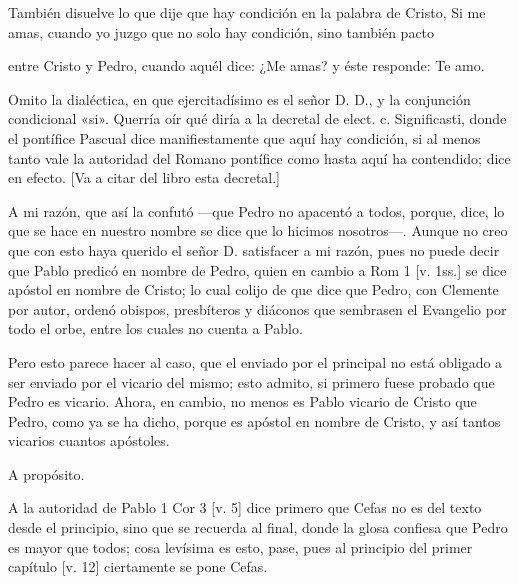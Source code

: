 También disuelve lo que dije que hay condición en la palabra de Cristo, Si me amas, cuando yo juzgo que no solo hay condición, sino también pacto

entre Cristo y Pedro, cuando aquél dice: ¿Me amas? y éste responde: Te amo.

Omito la dialéctica, en que ejercitadísimo es el señor D. D., y la conjunción condicional «si». Querría oír qué diría a la decretal de elect. c. Significasti, donde el pontífice Pascual dice manifiestamente que aquí hay condición, si al menos tanto vale la autoridad del Romano pontífice como hasta aquí ha contendido; dice en efecto. [Va a citar del libro esta decretal.]

A mi razón, que así la confutó —que Pedro no apacentó a todos, porque, dice, lo que se hace en nuestro nombre se dice que lo hicimos nosotros—. Aunque no creo que con esto haya querido el señor D. satisfacer a mi razón, pues no puede decir que Pablo predicó en nombre de Pedro, quien en cambio a Rom 1 [v. 1ss.] se dice apóstol en nombre de Cristo; lo cual colijo de que dice que Pedro, con Clemente por autor, ordenó obispos, presbíteros y diáconos que sembrasen el Evangelio por todo el orbe, entre los cuales no cuenta a Pablo.

Pero esto parece hacer al caso, que el enviado por el principal no está obligado a ser enviado por el vicario del mismo; esto admito, si primero fuese probado que Pedro es vicario. Ahora, en cambio, no menos es Pablo vicario de Cristo que Pedro, como ya se ha dicho, porque es apóstol en nombre de Cristo, y así tantos vicarios cuantos apóstoles.

A propósito.

A la autoridad de Pablo 1 Cor 3 [v. 5] dice primero que Cefas no es del texto desde el principio, sino que se recuerda al final, donde la glosa confiesa que Pedro es mayor que todos; cosa levísima es esto, pase, pues al principio del primer capítulo [v. 12] ciertamente se pone Cefas.


